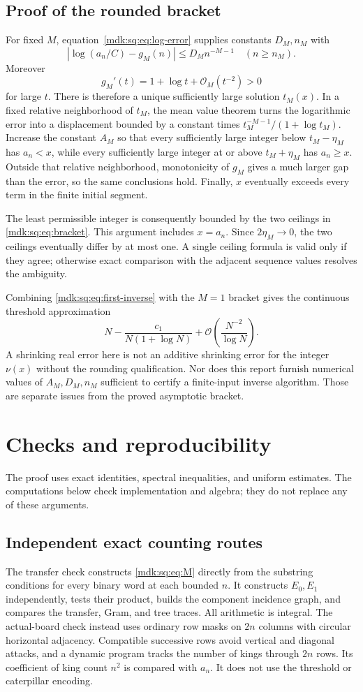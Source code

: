 \documentclass[11pt,letterpaper]{article}
\numberwithin{equation}{section}
\theoremstyle{remark}\newtheorem{remark}[theorem]{Remark}
\newcommand{\Oh}{\mathcal O}\newcommand{\Q}{\mathbb Q}\newcommand{\N}{\mathbb N}\newcommand{\R}{\mathbb R}
\begin{document}
\subsection{Proof of the rounded bracket}
For fixed $M$, equation~\eqref{mdk:sq:eq:log-error} supplies constants $D_M,n_M$ with
\[
|\log(a_n/C)-g_M(n)|\le D_Mn^{-M-1}\quad(n\ge n_M).
\]
Moreover
\[
g_M'(t)=1+\log t+\Oh_M(t^{-2})>0
\]
for large $t$. There is therefore a unique sufficiently large solution $t_M(x)$. In a fixed relative neighborhood of $t_M$, the mean value theorem turns the logarithmic error into a displacement bounded by a constant times
$t_M^{-M-1}/(1+\log t_M)$. Increase the constant $A_M$ so that every sufficiently large integer below $t_M-\eta_M$ has $a_n<x$, while every sufficiently large integer at or above $t_M+\eta_M$ has $a_n\ge x$. Outside that relative neighborhood, monotonicity of $g_M$ gives a much larger gap than the error, so the same conclusions hold. Finally, $x$ eventually exceeds every term in the finite initial segment.

The least permissible integer is consequently bounded by the two ceilings in \eqref{mdk:sq:eq:bracket}. This argument includes $x=a_n$. Since $2\eta_M\to0$, the two ceilings eventually differ by at most one. A single ceiling formula is valid only if they agree; otherwise exact comparison with the adjacent sequence values resolves the ambiguity.

Combining \eqref{mdk:sq:eq:first-inverse} with the $M=1$ bracket gives the continuous threshold approximation
\[
N-\frac{c_1}{N(1+\log N)}
+\Oh\left(\frac{N^{-2}}{\log N}\right).
\]
A shrinking real error here is not an additive shrinking error for the integer $\nu(x)$ without the rounding qualification. Nor does this report furnish numerical values of $A_M,D_M,n_M$ sufficient to certify a finite-input inverse algorithm. Those are separate issues from the proved asymptotic bracket.

\section{Checks and reproducibility}\label{mdk:sq:sec:checks}
The proof uses exact identities, spectral inequalities, and uniform estimates. The computations below check implementation and algebra; they do not replace any of these arguments.

\subsection{Independent exact counting routes}
The transfer check constructs \eqref{mdk:sq:eq:M} directly from the substring conditions for every binary word at each bounded $n$. It constructs $E_0,E_1$ independently, tests their product, builds the component incidence graph, and compares the transfer, Gram, and tree traces. All arithmetic is integral. The actual-board check instead uses ordinary row masks on $2n$ columns with circular horizontal adjacency. Compatible successive rows avoid vertical and diagonal attacks, and a dynamic program tracks the number of kings through $2n$ rows. Its coefficient of king count $n^2$ is compared with $a_n$. It does not use the threshold or caterpillar encoding.
\end{document}
